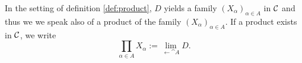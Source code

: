 \begin{remark}
	In the setting of definition \ref{def:product}, $D$ yields a family $(X_\alpha)_{\alpha \in A}$ in $\mathcal{C}$ and thus we we speak also of a product of the family $(X_\alpha)_{\alpha \in A}$. If a product exists in $\mathcal{C}$, we write
	\begin{equation}
		\prod_{\alpha \in A} X_\alpha := \lim_{\leftarrow \cat{A}} D.
	\end{equation}
\end{remark}
